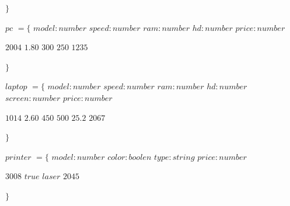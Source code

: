 \documentclass[12pt, letterpaper]{article}
\begin{document}
\begin{itemize}
\begin{itemize}
                                    $\}$ \vspace{.5cm}

                                    $pc$ $= \{$ $model:number$ $speed:number$ $ram:number$ $hd:number$ $price:number$ \vspace{.1cm}

                                    \hspace{2cm} $2004$ \hspace{2cm} $1.80$ \hspace{1.5cm} $300$ \hspace{1.5cm} $250$ \hspace{1.7cm} $1235$ \vspace{.1cm}

                                    $\}$ \vspace{.5cm}

                                   {\scriptsize $laptop$ $= \{$ $model:number$ $speed:number$ $ram:number$ $hd:number$ $screen:number$ $price:number$ \vspace{.1cm}

                                    \hspace{2cm} $1014$ \hspace{1.3cm} $2.60$ \hspace{1.3cm} $450$ \hspace{1.3cm} $500$ \hspace{1.3cm} $25.2$ \hspace{1.4cm} $2067$ \vspace{.1cm}

                                    $\}$  }\vspace{.5cm}

                                    $printer$ $= \{$ $model:number$ \hspace{.2cm} $color:boolen$ \hspace{.2cm} $type:string$ \hspace{.2cm} $price:number$ \vspace{.1cm}

                                    \hspace{3cm} $3008$ \hspace{2cm} $true$ \hspace{1.8cm} $laser$ \hspace{1.5cm} $2045$  \vspace{.1cm}

                                    $\}$ \vspace{.5cm}


\end{itemize}
\end{itemize}
\end{document}
